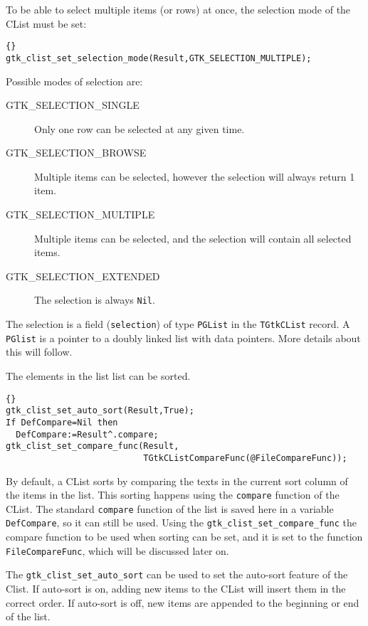 \documentclass[10pt]{article}
\begin{document}
To be able to select multiple items (or rows) at once, the selection mode of
the CList must be set: 
\begin{lstlisting}{}
gtk_clist_set_selection_mode(Result,GTK_SELECTION_MULTIPLE);
\end{lstlisting}
Possible modes of selection are:
\begin{description}
\item[GTK\_SELECTION\_SINGLE] Only one row can be selected at any given
time.
\item[GTK\_SELECTION\_BROWSE] Multiple items can be selected, however the
selection will always return 1 item.
\item[GTK\_SELECTION\_MULTIPLE] Multiple items can be selected, and the
selection will contain all selected items.
\item[GTK\_SELECTION\_EXTENDED] The selection is always \lstinline|Nil|.
\end{description}
The selection is a field (\lstinline|selection|) of type \lstinline|PGList| in the 
\lstinline|TGtkCList| record. A \lstinline|PGlist| is a pointer to a doubly linked 
list with data pointers. More details about this will follow.

The elements in the list list can be sorted. 
\begin{lstlisting}{}
gtk_clist_set_auto_sort(Result,True);
If DefCompare=Nil then
  DefCompare:=Result^.compare; 
gtk_clist_set_compare_func(Result,
                           TGtkCListCompareFunc(@FileCompareFunc));
\end{lstlisting}
By default, a CList sorts by comparing the texts in the current sort column 
of the items in the list. This sorting happens using the \lstinline|compare| 
function of the CList. The standard \lstinline|compare| function of the list 
is saved here in a variable \lstinline|DefCompare|, so it can still be used. 
Using the  \lstinline|gtk_clist_set_compare_func| the compare function to be 
used when sorting can be set, and it is set to the function 
\lstinline|FileCompareFunc|, which will be discussed later on.

The \lstinline|gtk_clist_set_auto_sort| can be used to set the auto-sort
feature of the Clist. If auto-sort is on, adding new items to the CList will
insert them in the correct order. If auto-sort is off, new items are
appended to the beginning or end of the list.
\end{document}
